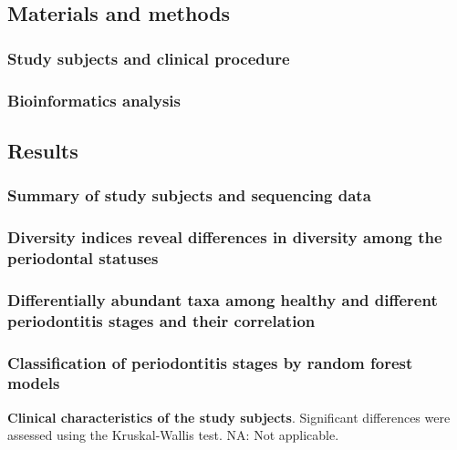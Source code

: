 \documentclass[11pt, a4paper, onecolumn, oneside]{report}
\begin{document}
        \subsection{Materials and methods}
            \subsubsection{Study subjects and clinical procedure}
            \subsubsection{Bioinformatics analysis}
        \newpage

        \subsection{Results}
            \subsubsection{Summary of study subjects and sequencing data}
            \subsubsection{Diversity indices reveal differences in diversity among the periodontal statuses}
            \subsubsection{Differentially abundant taxa among healthy and different periodontitis stages and their correlation}
            \subsubsection{Classification of periodontitis stages by random forest models}

            \begin{table}[p]
                \centering

                \caption[Clinical characteristics of the study subjects]{\textbf{Clinical characteristics of the study subjects}. Significant differences were assessed using the Kruskal-Wallis test. NA: Not applicable.}
                \label{tab:Periodontitis-clinical}
            \end{table}
            \clearpage
\end{document}
